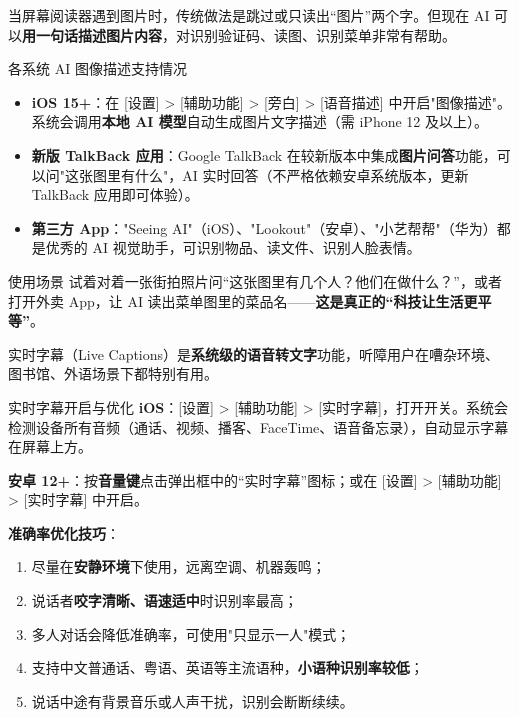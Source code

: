 
当屏幕阅读器遇到图片时，传统做法是跳过或只读出“图片”两个字。但现在 AI 可以\textbf{用一句话描述图片内容}，对识别验证码、读图、识别菜单非常有帮助。

\begin{tcbinfo}{各系统 AI 图像描述支持情况}
\begin{itemize}
  \item \textbf{iOS 15+}：在 [设置] > [辅助功能] > [旁白] > [语音描述] 中开启"图像描述"。系统会调用\textbf{本地 AI 模型}自动生成图片文字描述（需 iPhone 12 及以上）。
  \item \textbf{新版 TalkBack 应用}：Google TalkBack 在较新版本中集成\textbf{图片问答}功能，可以问"这张图里有什么"，AI 实时回答（不严格依赖安卓系统版本，更新 TalkBack 应用即可体验）。
  \item \textbf{第三方 App}："Seeing AI"（iOS）、"Lookout"（安卓）、"小艺帮帮"（华为）都是优秀的 AI 视觉助手，可识别物品、读文件、识别人脸表情。
\end{itemize}

\end{tcbinfo}

\begin{tcbpractice}{使用场景}
试着对着一张街拍照片问“这张图里有几个人？他们在做什么？”，或者打开外卖 App，让 AI 读出菜单图里的菜品名——\textbf{这是真正的“科技让生活更平等”}。

\end{tcbpractice}


实时字幕（Live Captions）是\textbf{系统级的语音转文字}功能，听障用户在嘈杂环境、图书馆、外语场景下都特别有用。

\begin{tcbinfo}{实时字幕开启与优化}
\textbf{iOS}：[设置] > [辅助功能] > [实时字幕]，打开开关。系统会检测设备所有音频（通话、视频、播客、FaceTime、语音备忘录），自动显示字幕在屏幕上方。

\textbf{安卓 12+}：按\textbf{音量键}点击弹出框中的“实时字幕”图标；或在 [设置] > [辅助功能] > [实时字幕] 中开启。

\textbf{准确率优化技巧}：

\begin{enumerate}
  \item 尽量在\textbf{安静环境}下使用，远离空调、机器轰鸣；
  \item 说话者\textbf{咬字清晰、语速适中}时识别率最高；
  \item 多人对话会降低准确率，可使用"只显示一人"模式；
  \item 支持中文普通话、粤语、英语等主流语种，\textbf{小语种识别率较低}；
  \item 说话中途有背景音乐或人声干扰，识别会断断续续。
\end{enumerate}

\end{tcbinfo}

